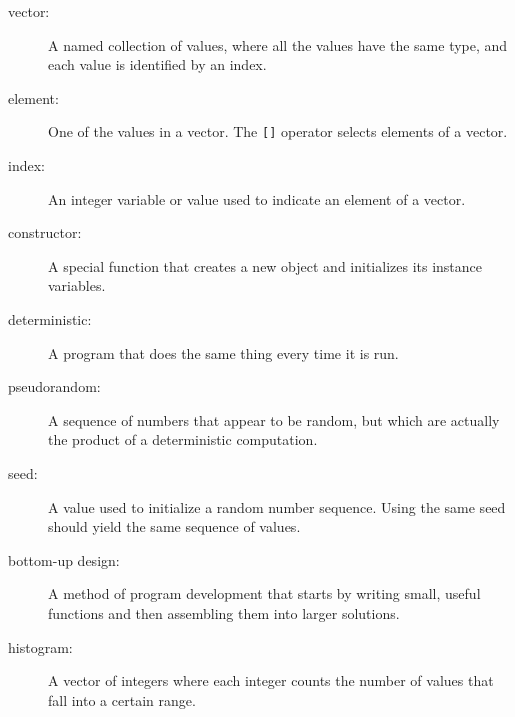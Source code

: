 \begin{description}

\item[vector:]  A named collection of values, where all the
values have the same type, and each value is identified by
an index.

\item[element:]  One of the values in a vector.  The {\tt []}
operator selects elements of a vector.

\item[index:]  An integer variable or value used to indicate
an element of a vector.

\item[constructor:]  A special function that creates a new
object and initializes its instance variables.

\item[deterministic:]  A program that does the same thing every
time it is run.

\item[pseudorandom:]  A sequence of numbers that appear to be
random, but which are actually the product of a deterministic
computation.

\item[seed:]  A value used to initialize a random number sequence.
Using the same seed should yield the same sequence of values.

\item[bottom-up design:]  A method of program development that
starts by writing small, useful functions and then assembling
them into larger solutions.

\item[histogram:]  A vector of integers where each integer
counts the number of values that fall into a certain range.


\end{description}
